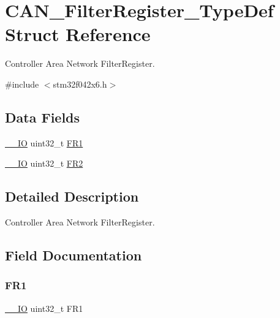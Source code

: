 \hypertarget{struct_c_a_n___filter_register___type_def}{}\section{C\+A\+N\+\_\+\+Filter\+Register\+\_\+\+Type\+Def Struct Reference}
\label{struct_c_a_n___filter_register___type_def}


Controller Area Network Filter\+Register.  




{\ttfamily \#include $<$stm32f042x6.\+h$>$}

\subsection*{Data Fields}
\begin{DoxyCompactItemize}
\item 
\hyperlink{core__sc300_8h_aec43007d9998a0a0e01faede4133d6be}{\+\_\+\+\_\+\+IO} uint32\+\_\+t \hyperlink{struct_c_a_n___filter_register___type_def_a92036953ac673803fe001d843fea508b}{F\+R1}
\item 
\hyperlink{core__sc300_8h_aec43007d9998a0a0e01faede4133d6be}{\+\_\+\+\_\+\+IO} uint32\+\_\+t \hyperlink{struct_c_a_n___filter_register___type_def_a7f7d80b45b7574463d7030fc8a464582}{F\+R2}
\end{DoxyCompactItemize}


\subsection{Detailed Description}
Controller Area Network Filter\+Register. 

\subsection{Field Documentation}
\mbox{\label{struct_c_a_n___filter_register___type_def_a92036953ac673803fe001d843fea508b}} 
\subsubsection{\texorpdfstring{F\+R1}{FR1}}
{\footnotesize\ttfamily \hyperlink{core__sc300_8h_aec43007d9998a0a0e01faede4133d6be}{\+\_\+\+\_\+\+IO} uint32\+\_\+t F\+R1}

